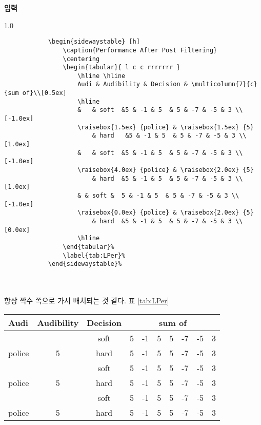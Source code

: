 \documentclass[12pt,a4paper]{report}
\begin{document}
	\singlespacing
	\textbf{입력}\\
		\begin{boxedminipage}[t]{1.0\linewidth}
		\small
		\begin{verbatim}	
			\begin{sidewaystable} [h]
				\caption{Performance After Post Filtering}
				\centering
				\begin{tabular}{ l c c rrrrrrr }
					\hline \hline
					Audi & Audibility & Decision & \multicolumn{7}{c}{sum of}\\[0.5ex]
					\hline
					& 	& soft 	&5 & -1 & 5  & 5 & -7 & -5 & 3 \\[-1.0ex]
					\raisebox{1.5ex} {police} & \raisebox{1.5ex} {5} 
						& hard   &5 & -1 & 5  & 5 & -7 & -5 & 3 \\[1.0ex]
					& 	& soft 	&5 & -1 & 5  & 5 & -7 & -5 & 3 \\[-1.0ex]
					\raisebox{4.0ex} {police} & \raisebox{2.0ex} {5} 
						& hard	&5 & -1 & 5  & 5 & -7 & -5 & 3 \\[1.0ex]
					& & soft &  5 & -1 & 5  & 5 & -7 & -5 & 3 \\[-1.0ex]
					\raisebox{0.0ex} {police} & \raisebox{2.0ex} {5} 
						& hard	&5 & -1 & 5  & 5 & -7 & -5 & 3 \\[0.0ex]
					\hline
				\end{tabular}%
				\label{tab:LPer}%
			\end{sidewaystable}%
		\end{verbatim} 
		\end{boxedminipage} \\ \\


		항상 짝수 쪽으로 가서 배치되는 것 같다.
	표 \ref{tab:LPer}
	
	\doublespacing
	\newpage
			\begin{sidewaystable} [h]
				\caption{Performance After Post Filtering}
				\centering
				\begin{tabular}{ l c c rrrrrrr }
					\hline \hline
					Audi & Audibility & Decision & \multicolumn{7}{c}{sum of}\\[0.5ex]
					\hline
					& 	& soft 	&5 & -1 & 5  & 5 & -7 & -5 & 3 \\[-1.0ex]
					\raisebox{1.5ex} {police} & \raisebox{1.5ex} {5} 
						& hard   &5 & -1 & 5  & 5 & -7 & -5 & 3 \\[1.0ex]
					& 	& soft 	&5 & -1 & 5  & 5 & -7 & -5 & 3 \\[-1.0ex]
					\raisebox{4.0ex} {police} & \raisebox{2.0ex} {5} 
						& hard	&5 & -1 & 5  & 5 & -7 & -5 & 3 \\[1.0ex]
					& & soft &  5 & -1 & 5  & 5 & -7 & -5 & 3 \\[-1.0ex]
					\raisebox{0.0ex} {police} & \raisebox{2.0ex} {5} 
						& hard	&5 & -1 & 5  & 5 & -7 & -5 & 3 \\[0.0ex]
					\hline
				\end{tabular}%
				\label{tab:LPer}%
			\end{sidewaystable}%
\end{document}
